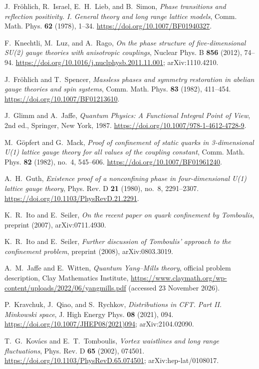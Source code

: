 J.~Fr\"ohlich, R.~Israel, E.~H.~Lieb, and B.~Simon, \emph{Phase transitions and reflection positivity. I. General theory and long range lattice models},
Comm. Math. Phys. \textbf{62} (1978), 1--34.
\url{https://doi.org/10.1007/BF01940327}.

F.~Knechtli, M.~Luz, and A.~Rago, \emph{On the phase structure of five-dimensional SU(2) gauge theories with anisotropic couplings},
Nuclear Phys. B \textbf{856} (2012), 74--94.
\url{https://doi.org/10.1016/j.nuclphysb.2011.11.001}; arXiv:1110.4210.

J.~Fr\"ohlich and T.~Spencer, \emph{Massless phases and symmetry restoration in abelian gauge theories and spin systems},
Comm. Math. Phys. \textbf{83} (1982), 411--454.
\url{https://doi.org/10.1007/BF01213610}.

J.~Glimm and A.~Jaffe, \emph{Quantum Physics: A Functional Integral Point of View}, 2nd ed.,
Springer, New York, 1987.
\url{https://doi.org/10.1007/978-1-4612-4728-9}.

M.~G\"opfert and G.~Mack, \emph{Proof of confinement of static quarks in 3-dimensional U(1) lattice gauge theory for all values of the coupling constant},
Comm. Math. Phys. \textbf{82} (1982), no.~4, 545--606.
\url{https://doi.org/10.1007/BF01961240}.

A.~H.~Guth, \emph{Existence proof of a nonconfining phase in four-dimensional U(1) lattice gauge theory},
Phys. Rev. D \textbf{21} (1980), no.~8, 2291--2307.
\url{https://doi.org/10.1103/PhysRevD.21.2291}.

K.~R.~Ito and E.~Seiler, \emph{On the recent paper on quark confinement by Tomboulis},
preprint (2007), arXiv:0711.4930.

K.~R.~Ito and E.~Seiler, \emph{Further discussion of Tomboulis' approach to the confinement problem},
preprint (2008), arXiv:0803.3019.

A.~M.~Jaffe and E.~Witten, \emph{Quantum Yang--Mills theory}, official problem description,
Clay Mathematics Institute, \url{https://www.claymath.org/wp-content/uploads/2022/06/yangmills.pdf}
(accessed 23 November 2026).

P.~Kravchuk, J.~Qiao, and S.~Rychkov, \emph{Distributions in CFT. Part II. Minkowski space},
J. High Energy Phys. \textbf{08} (2021), 094.
\url{https://doi.org/10.1007/JHEP08(2021)094}; arXiv:2104.02090.

T.~G.~Kov\'acs and E.~T.~Tomboulis, \emph{Vortex waistlines and long range fluctuations},
Phys. Rev. D \textbf{65} (2002), 074501.
\url{https://doi.org/10.1103/PhysRevD.65.074501}; arXiv:hep-lat/0108017.

